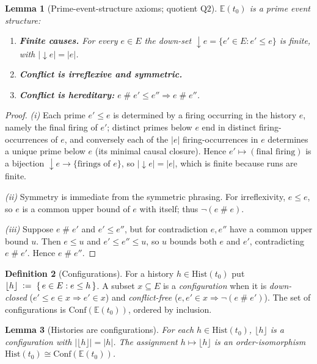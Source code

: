 \documentclass[11pt]{article}
\theoremstyle{definition}
\newtheorem{definition}{Definition}[section]
\theoremstyle{plain}
\newtheorem{lemma}[definition]{Lemma}
\newcommand{\Hist}{\mathrm{Hist}}
\newcommand{\Conf}{\mathrm{Conf}}
\newcommand{\Ev}{\mathbb{E}}
\newcommand{\Evt}{E}
\newcommand{\dpast}[1]{{\downarrow}#1}
\newcommand{\confl}{\mathrel{\#}}                  %
\newcommand{\defeq}{\;\mathrel{\vcentcolon=}\;}
\theoremstyle{remark}
\begin{document}
\begin{lemma}[Prime-event-structure axioms; quotient $\mathrm{Q2}$]
\label{lem:pes}
$\Ev(t_0)$ is a prime event structure:
\begin{enumerate}[label=\textup{(\roman*)},leftmargin=2.2em,itemsep=1pt]
  \item \textbf{Finite causes.} For every $e \in \Evt$ the down-set
  $\dpast e = \{e' \in \Evt : e' \le e\}$ is finite, with
  $|\dpast e| = |e|$.
  \item \textbf{Conflict is irreflexive and symmetric.}
  \item \textbf{Conflict is hereditary:}
  $e \confl e' \le e'' \Rightarrow e \confl e''$.
\end{enumerate}
\end{lemma}

\begin{proof}
\emph{(i)} Each prime $e' \le e$ is determined by a firing occurring in
the history $e$, namely the final firing of $e'$; distinct primes below
$e$ end in distinct firing-occurrences of $e$, and conversely each of the
$|e|$ firing-occurrences in $e$ determines a unique prime below $e$ (its
minimal causal closure). Hence $e' \mapsto (\text{final firing})$ is a
bijection $\dpast e \to \{\text{firings of } e\}$, so $|\dpast e| = |e|$,
which is finite because runs are finite.

\emph{(ii)} Symmetry is immediate from the symmetric phrasing. For
irreflexivity, $e \le e$, so $e$ is a common upper bound of $e$ with
itself; thus $\lnot(e \confl e)$.

\emph{(iii)} Suppose $e \confl e'$ and $e' \le e''$, but for
contradiction $e, e''$ have a common upper bound $u$. Then $e \le u$ and
$e' \le e'' \le u$, so $u$ bounds both $e$ and $e'$, contradicting
$e \confl e'$. Hence $e \confl e''$.
\end{proof}

\begin{definition}[Configurations]
\label{def:config}
For a history $h \in \Hist(t_0)$ put
$\lfloor h\rfloor \defeq \{\, e \in \Evt : e \le h \,\}$. A subset
$x \subseteq \Evt$ is a \emph{configuration} when it is
\emph{down-closed} ($e' \le e \in x \Rightarrow e' \in x$) and
\emph{conflict-free} ($e,e' \in x \Rightarrow \lnot(e \confl e')$). The
set of configurations is $\Conf(\Ev(t_0))$, ordered by inclusion.
\end{definition}

\begin{lemma}[Histories are configurations]
\label{lem:histconf}
For each $h \in \Hist(t_0)$, $\lfloor h\rfloor$ is a configuration with
$|\lfloor h\rfloor| = |h|$. The assignment $h \mapsto \lfloor h\rfloor$
is an order-isomorphism $\Hist(t_0) \cong \Conf(\Ev(t_0))$.
\end{lemma}
\end{document}
